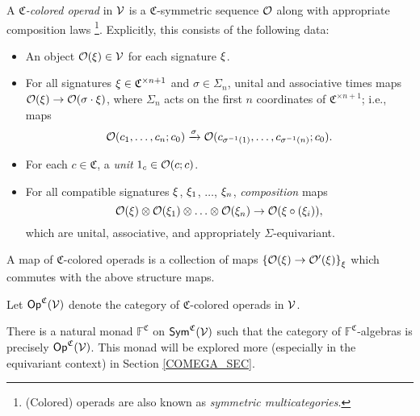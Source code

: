 \documentclass[a4paper,10pt
,draft
]{article}%
\renewcommand{\1}{\eta}%
\begin{document}
\begin{definition}
      A \textit{$\mathfrak C$-colored operad} in $\mathcal V$ 
      is a $\mathfrak C$-symmetric sequence $\mathcal{O}$ along with appropriate composition laws \footnote{
        (Colored) operads are also known as \textit{symmetric multicategories}.}.
      Explicitly, this consists of the following data:
      \begin{itemize} %
      \item An object $\mathcal{O}(\xi) \in \mathcal V$ for each signature $\xi$.
      \item For all signatures $\xi \in \mathfrak C^{\times n+1}$ and $\sigma \in \Sigma_n$,
            unital and associative times maps $\mathcal{O}(\xi) \to \mathcal{O}(\sigma \cdot \xi)$,
            where $\Sigma_n$ acts on the first $n$ coordinates of $\mathfrak C^{\times n+1}$;
            i.e., maps
            \begin{equation}
                  \mathcal{O}(c_1, \ldots, c_n; c_0) \xrightarrow{\sigma} \mathcal{O}(c_{\sigma^{-1}(1)}, \ldots, c_{\sigma^{-1}(n)}; c_0).
            \end{equation}
      \item For each $c \in \mathfrak C$, a \textit{unit} $1_c \in \mathcal{O}(c;c)$.                        
      \item For all compatible signatures $\xi$, $\xi_1$, $\dots$, $\xi_n$,
            \textit{composition} maps
            \begin{equation}
                  \mathcal{O}(\xi) \otimes \mathcal{O}(\xi_1) \otimes \ldots \otimes \mathcal{O}(\xi_n) \to \mathcal{O}(\xi \circ (\xi_i)),
            \end{equation}
            which are unital, associative, and appropriately $\Sigma$-equivariant.
      \end{itemize}

      A map of $\mathfrak C$-colored operads is a collection of maps
      $\left\{\mathcal{O}(\xi) \to \mathcal{O}'(\xi)\right\}_{\xi}$
      which commutes with the above structure maps.
      
      Let $\mathsf{Op}^{\mathfrak C}(\mathcal V)$ denote the category of $\mathfrak C$-colored operads in $\mathcal V$.
\end{definition}

\begin{remark}
      There is a natural monad $\mathbb F^{\mathfrak C}$ on $\mathsf{Sym}^{\mathfrak C}(\mathcal V)$ such that
      the category of $\mathbb F^{\mathfrak C}$-algebras is precisely $\mathsf{Op}^{\mathfrak C}(\mathcal V)$.
      This monad will be explored more (especially in the equivariant context) in Section \ref{COMEGA_SEC}.
\end{remark}
\end{document}

